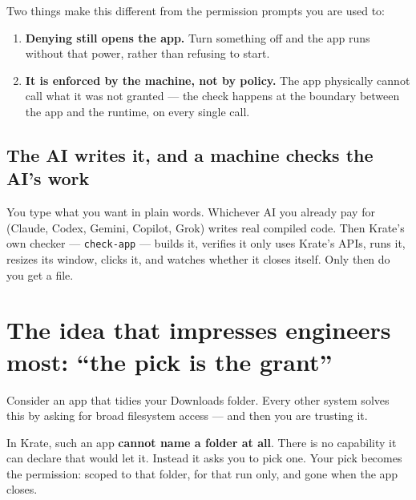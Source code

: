\documentclass[11pt,a4paper]{report}
\begin{document}
Two things make this different from the permission prompts you are used
to:

\begin{enumerate}[leftmargin=*]
  \item \textbf{Denying still opens the app.} Turn something off and the
    app runs without that power, rather than refusing to start.
  \item \textbf{It is enforced by the machine, not by policy.} The app
    physically cannot call what it was not granted --- the check happens at
    the boundary between the app and the runtime, on every single call.
\end{enumerate}

\subsection{The AI writes it, and a machine checks the AI's work}

You type what you want in plain words. Whichever AI you already pay for
(Claude, Codex, Gemini, Copilot, Grok) writes real compiled code. Then
Krate's own checker --- \texttt{check-app} --- builds it, verifies it only
uses Krate's APIs, runs it, resizes its window, clicks it, and watches
whether it closes itself. Only then do you get a file.

\section{The idea that impresses engineers most: ``the pick is the grant''}

Consider an app that tidies your Downloads folder. Every other system
solves this by asking for broad filesystem access --- and then you are
trusting it.

In Krate, such an app \textbf{cannot name a folder at all}. There is no
capability it can declare that would let it. Instead it asks you to pick
one. Your pick becomes the permission: scoped to that folder, for that run
only, and gone when the app closes.
\end{document}
